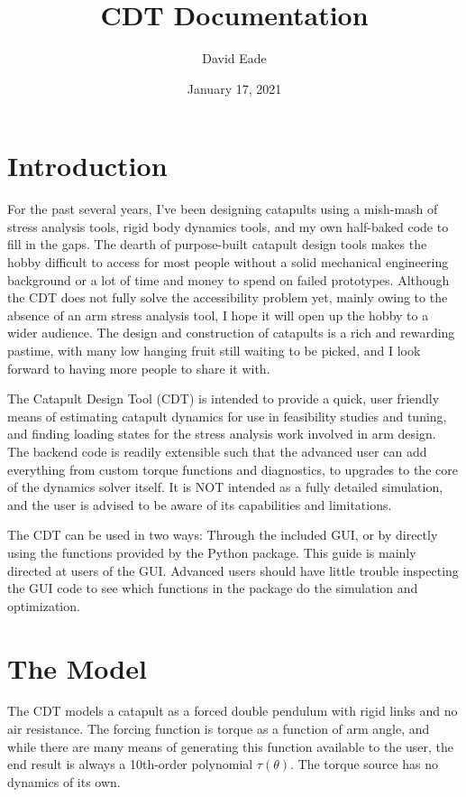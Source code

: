 \documentclass{article}
\title{CDT Documentation}
\author{David Eade}
\date{January 17, 2021}
\begin{document}
\maketitle

\tableofcontents

\section{Introduction}
For the past several years, I've been designing catapults using a mish-mash of stress analysis tools, rigid body dynamics tools, and my own half-baked code to fill in the gaps. The dearth of purpose-built catapult design tools makes the hobby difficult to access for most people without a solid mechanical engineering background or a lot of time and money to spend on failed prototypes. Although the CDT does not fully solve the accessibility problem yet, mainly owing to the absence of an arm stress analysis tool, I hope it will open up the hobby to a wider audience. The design and construction of catapults is a rich and rewarding pastime, with many low hanging fruit still waiting to be picked, and I look forward to having more people to share it with.\par
The Catapult Design Tool (CDT) is intended to provide a quick, user friendly means of estimating catapult dynamics for use in feasibility studies and tuning, and finding loading states for the stress analysis work involved in arm design. The backend code is readily extensible such that the advanced user can add everything from custom torque functions and diagnostics, to upgrades to the core of the dynamics solver itself. It is NOT intended as a fully detailed simulation, and the user is advised to be aware of its capabilities and limitations.\par
The CDT can be used in two ways: Through the included GUI, or by directly using the functions provided by the Python package. This guide is mainly directed at users of the GUI. Advanced users should have little trouble inspecting the GUI code to see which functions in the package do the simulation and optimization.

\section{The Model}
The CDT models a catapult as a forced double pendulum with rigid links and no air resistance.  The forcing function is torque as a function of arm angle, and while there are many means of generating this function available to the user, the end result is always a 10th-order polynomial $\tau(\theta)$. The torque source has no dynamics of its own.\\
\end{document}
